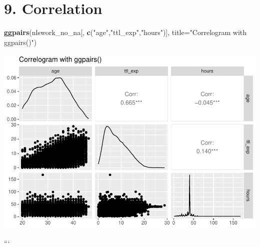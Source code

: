 \documentclass[
]{article}
\newenvironment{Shaded}{\begin{snugshade}}{\end{snugshade}}
\newcommand{\AttributeTok}[1]{\textcolor[rgb]{0.13,0.29,0.53}{#1}}
\newcommand{\FunctionTok}[1]{\textcolor[rgb]{0.13,0.29,0.53}{\textbf{#1}}}
\newcommand{\NormalTok}[1]{#1}
\newcommand{\StringTok}[1]{\textcolor[rgb]{0.31,0.60,0.02}{#1}}
\begin{document}
\hypertarget{correlation}{%
\section{9. Correlation}\label{correlation}}

\begin{Shaded}
\begin{Highlighting}[]
\FunctionTok{ggpairs}\NormalTok{(nlswork\_no\_na[, }\FunctionTok{c}\NormalTok{(}\StringTok{"age"}\NormalTok{,}\StringTok{"ttl\_exp"}\NormalTok{,}\StringTok{"hours"}\NormalTok{)], }\AttributeTok{title=}\StringTok{"Correlogram with ggpairs()"}\NormalTok{)}
\end{Highlighting}
\end{Shaded}

\includegraphics{RIntro_files/figure-latex/unnamed-chunk-28-1.pdf}

```
\end{document}

